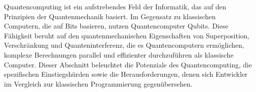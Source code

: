 
Quantencomputing ist ein aufstrebendes Feld der Informatik, das auf den Prinzipien der Quantenmechanik basiert. 
Im Gegensatz zu klassischen Computern, die auf Bits basieren, nutzen Quantencomputer Qubits. 
Diese Fähigkeit beruht auf den quantenmechanischen 
Eigenschaften von Superposition, Verschränkung und Quanteninterferenz, die es Quantencomputern ermöglichen, 
komplexe Berechnungen parallel und effizienter durchzuführen als klassische Computer. Dieser Abschnitt beleuchtet 
die Potenziale des Quantencomputing, die spezifischen Einstiegshürden sowie die 
Herausforderungen, denen sich Entwickler im Vergleich zur klassischen Programmierung gegenübersehen. 

